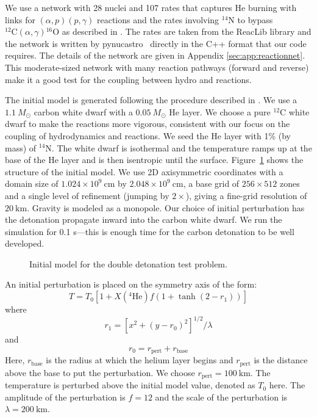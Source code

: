 \documentclass[linenumbers,trackchanges]{aastex631}
\newcommand{\pynucastro}{{\sf pynucastro}}
\newcommand{\isot}[2]{$^{#2}\mathrm{#1}$}
\newcommand{\isotm}[2]{{}^{#2}\mathrm{#1}}
\begin{document}
We use a network with 28 nuclei and 107 rates that captures He burning with
links for $(\alpha,p)(p,\gamma)$ reactions and the rates involving \isot{N}{14}
to bypass $\isotm{C}{12}(\alpha,\gamma)\isotm{O}{16}$ as described in
\cite{shenbildsten}.  The rates are taken from the ReacLib library
\citep{reaclib} and the network is written by \pynucastro~\citep{pynucastro}
directly in the C++ format that our code requires.  The details of the network
are given in Appendix \ref{sec:app:reactionnet}. This moderate-sized network
with many reaction pathways (forward and reverse) make it a good test for the
coupling between hydro and reactions.


The initial model is generated following the procedure described in
\citep{subchandra}.  We use a $1.1~M_\odot$ carbon white dwarf with a
$0.05~M_\odot$ He layer.  We choose a pure \isot{C}{12} white dwarf to make the reactions more vigorous, consistent with our focus on the coupling of hydrodynamics and reactions.  We seed the He layer with 1\% (by mass) of
\isot{N}{14}.  The white dwarf is isothermal and the temperature ramps
up at the base of the He layer and is then isentropic until the
surface.  Figure~\ref{fig:subch_initial_model} shows the structure of
the initial model.  We use 2D axisymmetric coordinates with a domain
size of $1.024\times 10^9~\mathrm{cm}$ by $2.048\times
10^9~\mathrm{cm}$, a base grid of $256 \times 512$ zones and a single
level of refinement (jumping by $2\times$), giving a fine-grid
resolution of $20~\mathrm{km}$.  Gravity is modeled as a monopole.
Our choice of initial perturbation has the detonation propagate inward
into the carbon white dwarf.  We run the simulation for 0.1 s---this
is enough time for the carbon detonation to be well developed.

\begin{figure}[t]
\centering
{}
\caption{\label{fig:subch_initial_model} Initial model for the double detonation test problem.}
\end{figure}

An initial perturbation is placed on the symmetry axis of the form:
\begin{equation}
  T = T_0 \left [ 1 + X(\isotm{He}{4}) f (1 + \tanh(2 - r_1)) \right ]
\end{equation}
where
\begin{equation}
  r_1 = \left [ x^2 + (y - r_0)^2 \right ]^{1/2} / \lambda
\end{equation}
and
\begin{equation}
  r_0 = r_\mathrm{pert} + r_\mathrm{base}
\end{equation}
Here, $r_\mathrm{base}$ is the radius at which the helium layer begins
and $r_\mathrm{pert}$ is the distance above the base to put the perturbation.  We
choose $r_\mathrm{pert} = 100~\mathrm{km}$.  The temperature is perturbed above
the initial model value, denoted as $T_0$ here.  The amplitude of the perturbation
is $f = 12$ and the scale of the perturbation is $\lambda = 200~\mathrm{km}$.
\end{document}
